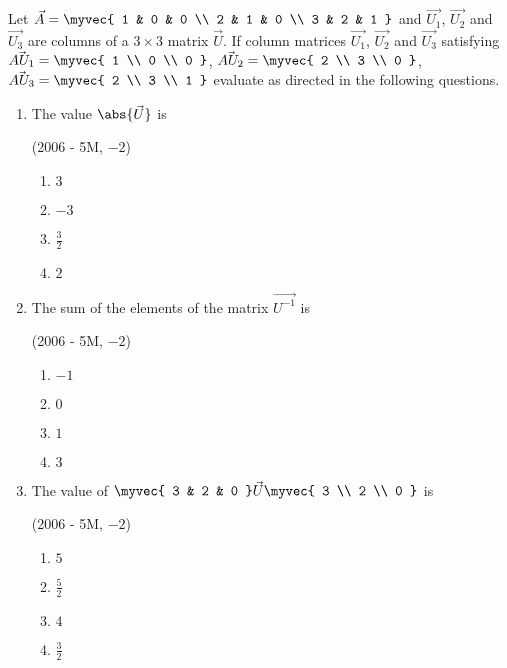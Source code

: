 \iffalse
\title{ASSIGNMENT - 2}
\author{EE24BTECH11019 - DWARAK A}
\section{paragraph}
\fi



	\item Let $\vec{A} = \myvec{
		1 & 0 & 0 \\
		2 & 1 & 0 \\
	3 & 2 & 1 }$ and $\vec{U_1}$, $\vec{U_2}$ and $\vec{U_3}$ are columns of a $3\times3$ matrix $\vec{U}$. If column matrices $\vec{U_1}$, $\vec{U_2}$ and $\vec{U_3}$ satisfying 
	$\vec{AU_1} = \myvec{
		1 \\
		0 \\
		0 }$,
	$\vec{AU_2} = \myvec{
		2 \\
		3 \\
		0 }$,
	$\vec{AU_3} = \myvec{
		2 \\
		3 \\
		1 }$ evaluate as directed in the following questions.

	\begin{enumerate}
		\item The value $\abs{\vec{U}}$ is

			\hfill(2006 - 5M, $-2$)

			\begin{enumerate}
				\item $3$
				\item $-3$
			\item $\frac{3}{2}$
				\item $2$
			\end{enumerate}

		\item The sum of the elements of the matrix $\vec{U^{-1}}$ is

			\hfill(2006 - 5M, $-2$)

			\begin{enumerate}
				\item $-1$
				\item $0$
				\item $1$
				\item $3$
			\end{enumerate}

		\item The value of $\myvec{ 3 & 2 & 0 }
				\vec{U}
				\myvec{ 3 \\ 2 \\ 0 }$ is

			\hfill(2006 - 5M, $-2$)
			\begin{enumerate}
				\item $5$
				\item $\frac{5}{2}$
				\item $4$
				\item $\frac{3}{2}$
			\end{enumerate}
	\end{enumerate}

